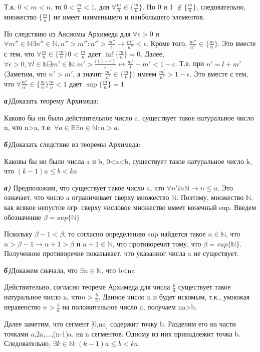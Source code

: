 \documentclass[10pt]{article}
\begin{document}
\begin{solution}
Т.к. $0<m<n$, то $0<\frac{m}{n}<1$, для $\forall \frac{m}{n} \in \{\frac{m}{n}\}$. Но 0 и 1 $\notin \{\frac{m}{n}\}$, следовательно, множество $\{\frac{m}{n}\}$ не имеет наименьшего и наибольшего элементов.

По следствию из Аксиомы Архимеда для $\forall \epsilon >0$ и $\forall m'' \in \mathbb{N} \exists n'' \in \mathbb{N} , n''>m'': n''>\frac{m''}{\epsilon} \rightarrow \frac{m''}{n''}<\epsilon$.
Кроме того, $\frac{m''}{n''} \in \{\frac{m}{n}\}$. Это вместе с тем, что $\forall \frac{m}{n} \in \{\frac{m}{n}\}   0<\frac{m}{n}$ дает $\inf\{\frac{m}{n}\}=0$. 
Далее, $\forall \epsilon >0, \forall l \in \mathbb{N} \exists m' \in \mathbb{N}: m'> \frac{l(1-\epsilon)}{\epsilon} \leftrightarrow \frac{m'}{l}+m' < 1 - \epsilon$. Т.е. при $n'=l+m'$ (Заметим, что $n'>m'$, а значит $\frac{m'}{n'} \in \{\frac{m}{n}\})$ имеем $\frac{m'}{n'} > 1- \epsilon$. Это вместе с тем, что 
$\forall \frac{m'}{n'} \in \{\frac{m}{n}\}  \frac{m}{n}<1$ дает $\sup\{\frac{m}{n}\}=1$
\end{solution}


\begin{problem}
\emph{\textbf{а)}}Доказать теорему Архимеда:

Каково бы ни было действительное число a, существует такое натуральное число n, что n>a, т.е. $\forall a \in \mathbb{R} \exists n \in \mathbb{N}: n>a$.

\emph{\textbf{б)}}Доказать следствие из теоремы Архимеда:

Каковы бы ни были числа a и b, 0<a<b, существует такое натуральное число k, что $(k-1)a\leq b<ka$
\end{problem}

\begin{solution}
\emph{\textbf{а)}} Предположим, что существует такое число a, что $\forall n 'in \mathbb{N} \rightarrow n \leq a$. Это означает, что число a ограничивает сверху множество $\mathbb{N}$. Поэтому, множество $\mathbb{N}$, как всякое непустое огр. сверху числовое множество имеет конечный sup. Введем обозначение $\beta = sup\{\mathbb{N}\}$

Пскольку $\beta-1 <\beta$, то согласно определению sup найдется такое $n\in\mathbb{N}$, что $n>\beta -1 \rightarrow n+1>\beta$ и $n+1 \in \mathbb{N}$, что противоречит тому, что $\beta = sup\{\mathbb{N}\}$. Полученное противоречие показывает, что указанног числа a не существует.

\medskip
\emph{\textbf{б)}}Докажем сначала, что $\exists n \in \mathbb{N}$, что b<na

Действительно, согласно теореме Архимеда для числа $\frac{b}{a}$ существует такое натуральное число n, что$ n>\frac{b}{a}$. Данное число n и будет искомым, т.к., умножая неравенство $n>\frac{b}{a}$ на положительное число a, получаем na>b.

Далее заметим, что сегмент [0,na] содержит точку b. Разделим его на части точками a,2a,...,(n-1)a. на n сегментов. Одному из них принадлежит точка b. Следовательно, $\exists k \in \mathbb{N}: (k-1)a\leq b <ka$.
\end{solution}
\end{document}
